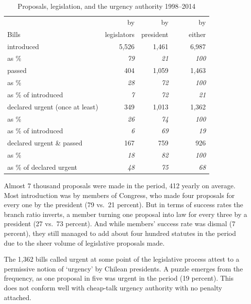 \documentclass[letter,12pt]{article}
\begin{document}
\begin{table}
\centering
\begin{tabular}{lrrr}
                                &  by           &  by          &    by      \\
Bills                           &  legislators  &  president   &    ~~~~either  \\ \hline
introduced                      &        5,526  &       1,461  &     6,987  \\
as \%                           &    \emph{79}  &   \emph{21}  & \emph{100} \\ \hdashline
passed                          &          404  &       1,059  &     1,463  \\
as \%                           &    \emph{28}  &   \emph{72}  & \emph{100} \\
as \% of introduced             &     \emph{7}  &   \emph{72}  &  \emph{21} \\ \hdashline
declared urgent (once at least) &          349  &       1,013  &     1,362  \\
as \%                           &    \emph{26}  &   \emph{74}  & \emph{100} \\
as \% of introduced             &     \emph{6}  &   \emph{69}  &  \emph{19} \\ \hdashline
declared urgent \& passed       &          167  &         759  &       926  \\
as \%                           &    \emph{18}  &   \emph{82}  & \emph{100} \\
as \% of declared urgent        &    \emph{48}  &   \emph{75}  &  \emph{68} \\ \hline
\end{tabular}
\caption{Proposals, legislation, and the urgency authority 1998--2014}\label{T:billDescriptives}
\end{table}

Almost 7 thousand proposals were made in the period, 412 yearly on average. Most introduction was by members of Congress, who made four proposals for every one by the president (79 vs.\ 21 percent). But in terms of success rates the branch ratio inverts, a member turning one proposal into law for every three by a president (27 vs.\ 73 percent). And while members' success rate was dismal (7 percent), they still managed to add about four hundred statutes in the period due to the sheer volume of legislative proposals made. 

The 1,362 bills called urgent at some point of the legislative process attest to a permissive notion of `urgency' by Chilean presidents. A puzzle emerges from the frequency, as one proposal in five was urgent in the period (19 percent). This does not conform well with cheap-talk urgency authority with no penalty attached. 
\end{document}
